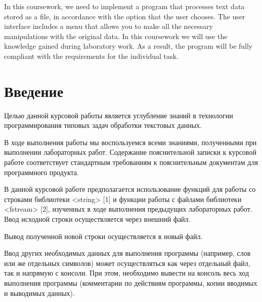 \documentclass[12pt,a4paper]{article}  %
\begin{document}
In this coursework, we need to implement a program that processes text data stored as a file, in accordance with the option that the user chooses. The user interface includes a menu that allows you to make all the necessary manipulations with the original data. In this coursework we will use the knowledge gained during laboratory work. As a result, the program will be fully compliant with the requirements for the individual task.

\newpage

\tableofcontents

\newpage

\section*{Введение}

Целью данной курсовой работы является углубление знаний в технологии программирования типовых задач
обработки текстовых данных.

В ходе выполнения работы мы воспользуемся всеми знаниями, полученными при выполнении лабораторных работ.
Содержание пояснительной записки к курсовой работе соответствует стандартным требованиям к пояснительным документам для программного продукта.

В данной курсовой работе предполагается использование функций для
работы со строками библиотеки <string> [1] и функции работы с файлами библиотеки <fstream> [2],
изученных в ходе выполнения
предыдущих лабораторных работ.
Ввод исходной строки осуществляется через внешний файл. 

Вывод полученной новой строки осуществляется в новый файл. 

Ввод других необходимых данных для выполнения программы (например, слов или же
отдельных символов) может осуществляться как через отдельный файл, так и
напрямую с консоли. При этом, необходимо вывести на консоль весь ход
выполнения программы (комментарии по действиям программы, копии
вводимых и выводимых данных).
\end{document}
